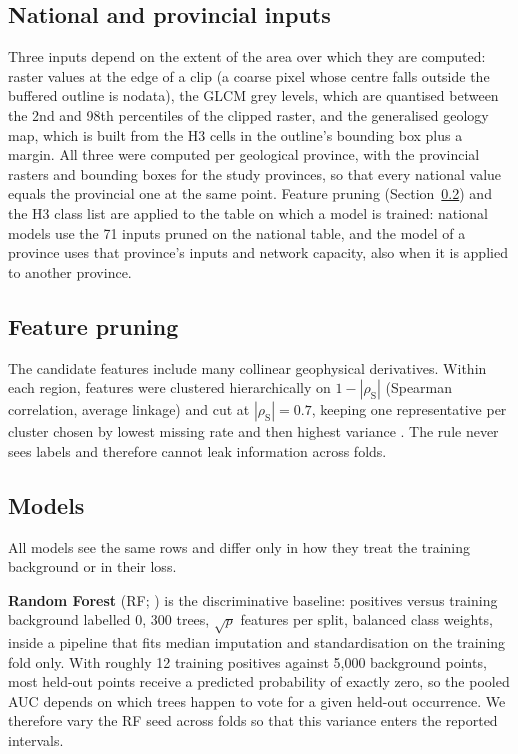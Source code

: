 \documentclass[pdflatex,sn-apa]{sn-jnl}
\begin{document}
\subsection{National and provincial inputs}\label{sec:framework}

Three inputs depend on the extent of the area over which they are computed: raster values at the edge of a clip (a coarse pixel whose centre falls outside the buffered outline is nodata), the GLCM grey levels, which are quantised between the 2nd and 98th percentiles of the clipped raster, and the generalised geology map, which is built from the H3 cells in the outline's bounding box plus a margin. All three were computed per geological province, with the provincial rasters and bounding boxes for the study provinces, so that every national value equals the provincial one at the same point. Feature pruning (Section~\ref{sec:pruning}) and the H3 class list are applied to the table on which a model is trained: national models use the 71 inputs pruned on the national table, and the model of a province uses that province's inputs and network capacity, also when it is applied to another province.

\subsection{Feature pruning}\label{sec:pruning}

The candidate features include many collinear geophysical derivatives. Within each region, features were clustered hierarchically on $1-|\rho_{\mathrm{S}}|$ (Spearman correlation, average linkage) and cut at $|\rho_{\mathrm{S}}| = 0.7$, keeping one representative per cluster chosen by lowest missing rate and then highest variance \citep{Dormann2013}. The rule never sees labels and therefore cannot leak information across folds.

\subsection{Models}\label{sec:models}

All models see the same rows and differ only in how they treat the training background or in their loss.

\textbf{Random Forest} (RF; \citealp{Breiman2001}) is the discriminative baseline: positives versus training background labelled 0, 300 trees, $\sqrt{p}$ features per split, balanced class weights, inside a pipeline that fits median imputation and standardisation on the training fold only. With roughly 12 training positives against 5,000 background points, most held-out points receive a predicted probability of exactly zero, so the pooled AUC depends on which trees happen to vote for a given held-out occurrence. We therefore vary the RF seed across folds so that this variance enters the reported intervals.
\end{document}
